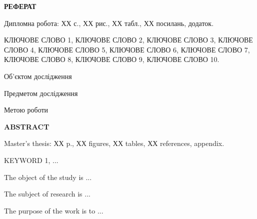\begin{center}
    \textbf{РЕФЕРАТ}
\end{center} 

Дипломна робота: ХХ с., ХХ рис., ХХ табл., ХХ посилань, додаток.

КЛЮЧОВЕ СЛОВО 1, КЛЮЧОВЕ СЛОВО 2, КЛЮЧОВЕ СЛОВО 3, КЛЮЧОВЕ СЛОВО 4, КЛЮЧОВЕ СЛОВО 5, КЛЮЧОВЕ СЛОВО 6, КЛЮЧОВЕ СЛОВО 7, КЛЮЧОВЕ СЛОВО 8, КЛЮЧОВЕ СЛОВО 9, КЛЮЧОВЕ СЛОВО 10.

Об’єктом дослідження 

Предметом дослідження 

Метою роботи 

\newpage

\begin{center}
    \textbf{ABSTRACT}
\end{center} 

Master's thesis: ХХ p., ХХ figures, ХХ tables, ХХ references, appendix.

KEYWORD 1, ...

The object of the study is ...

The subject of research is ...

The purpose of the work is to ...

\newpage